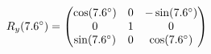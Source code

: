 \documentclass[preview]{standalone}
\begin{document}
\begin{align*}
\special{dvisvgm:raw <g id='unique000'>}R_y(7.6^\circ) = \begin{pmatrix} \cos(7.6^\circ) & 0 & -\sin(7.6^\circ) \\ 0 & 1 & 0 \\ \sin(7.6^\circ) & 0 & \cos(7.6^\circ) \end{pmatrix}\special{dvisvgm:raw </g>}
\end{align*}
\end{document}
